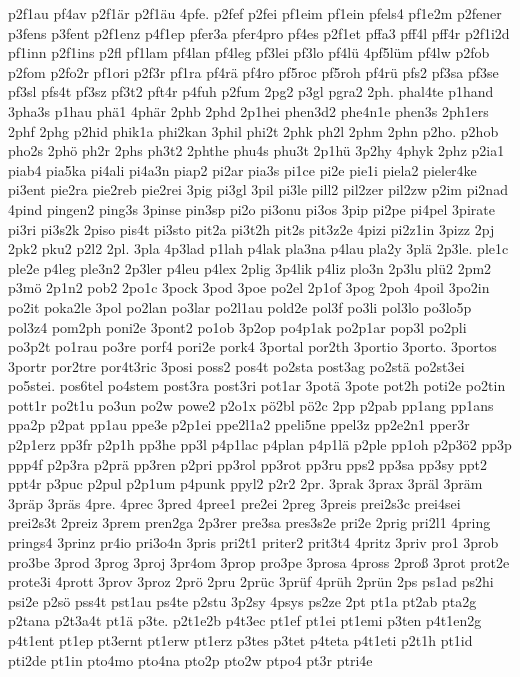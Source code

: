 {p2f1au
pf4av
p2f1är
p2f1äu
4pfe.
p2fef
p2fei
pf1eim
pf1ein
pfels4
pf1e2m
p2fener
p3fens
p3fent
p2f1enz
p4f1ep
pfer3a
pfer4pro
pf4es
p2f1et
pffa3
pff4l
pff4r
p2f1i2d
pf1inn
p2f1ins
p2fl
pf1lam
pf4lan
pf4leg
pf3lei
pf3lo
pf4lü
4pf5lüm
pf4lw
p2fob
p2fom
p2fo2r
pf1ori
p2f3r
pf1ra
pf4rä
pf4ro
pf5roc
pf5roh
pf4rü
pfs2
pf3sa
pf3se
pf3sl
pfs4t
pf3sz
pf3t2
pft4r
p4fuh
p2fum
2pg2
p3gl
pgra2
2ph.
phal4te
p1hand
3pha3s
p1hau
phä1
4phär
2phb
2phd
2p1hei
phen3d2
phe4n1e
phen3s
2ph1ers
2phf
2phg
p2hid
phik1a
phi2kan
3phil
phi2t
2phk
ph2l
2phm
2phn
p2ho.
p2hob
pho2s
2phö
ph2r
2phs
ph3t2
2phthe
phu4s
phu3t
2p1hü
3p2hy
4phyk
2phz
p2ia1
piab4
pia5ka
pi4ali
pi4a3n
piap2
pi2ar
pia3s
pi1ce
pi2e
pie1i
piela2
pieler4ke
pi3ent
pie2ra
pie2reb
pie2rei
3pig
pi3gl
3pil
pi3le
pill2
pil2zer
pil2zw
p2im
pi2nad
4pind
pingen2
ping3s
3pinse
pin3sp
pi2o
pi3onu
pi3os
3pip
pi2pe
pi4pel
3pirate
pi3ri
pi3s2k
2piso
pis4t
pi3sto
pit2a
pi3t2h
pit2s
pit3z2e
4pizi
pi2z1in
3pizz
2pj
2pk2
pku2
p2l2
2pl.
3pla
4p3lad
p1lah
p4lak
pla3na
p4lau
pla2y
3plä
2p3le.
ple1c
ple2e
p4leg
ple3n2
2p3ler
p4leu
p4lex
2plig
3p4lik
p4liz
plo3n
2p3lu
plü2
2pm2
p3mö
2p1n2
pob2
2po1c
3pock
3pod
3poe
po2el
2p1of
3pog
2poh
4poil
3po2in
po2it
poka2le
3pol
po2lan
po3lar
po2l1au
pold2e
pol3f
po3li
pol3lo
po3lo5p
pol3z4
pom2ph
poni2e
3pont2
po1ob
3p2op
po4p1ak
po2p1ar
pop3l
po2pli
po3p2t
po1rau
po3re
porf4
pori2e
pork4
3portal
por2th
3portio
3porto.
3portos
3portr
por2tre
por4t3ric
3posi
poss2
pos4t
po2sta
post3ag
po2stä
po2st3ei
po5stei.
pos6tel
po4stem
post3ra
post3ri
pot1ar
3potä
3pote
pot2h
poti2e
po2tin
pott1r
po2t1u
po3un
po2w
powe2
p2o1x
pö2bl
pö2c
2pp
p2pab
pp1ang
pp1ans
ppa2p
p2pat
pp1au
ppe3e
p2p1ei
ppe2l1a2
ppeli5ne
ppel3z
pp2e2n1
pper3r
p2p1erz
pp3fr
p2p1h
pp3he
pp3l
p4p1lac
p4plan
p4p1lä
p2ple
pp1oh
p2p3ö2
pp3p
ppp4f
p2p3ra
p2prä
pp3ren
p2pri
pp3rol
pp3rot
pp3ru
pps2
pp3sa
pp3sy
ppt2
ppt4r
p3puc
p2pul
p2p1um
p4punk
ppyl2
p2r2
2pr.
3prak
3prax
3präl
3präm
3präp
3präs
4pre.
4prec
3pred
4pree1
pre2ei
2preg
3preis
prei2s3c
prei4sei
prei2s3t
2preiz
3prem
pren2ga
2p3rer
pre3sa
pres3s2e
pri2e
2prig
pri2l1
4pring
prings4
3prinz
pr4io
pri3o4n
3pris
pri2t1
priter2
prit3t4
4pritz
3priv
pro1
3prob
pro3be
3prod
3prog
3proj
3pr4om
3prop
pro3pe
3prosa
4pross
2proß
3prot
prot2e
prote3i
4prott
3prov
3proz
2prö
2pru
2prüc
3prüf
4prüh
2prün
2ps
ps1ad
ps2hi
psi2e
p2sö
pss4t
pst1au
ps4te
p2stu
3p2sy
4psys
ps2ze
2pt
pt1a
pt2ab
pta2g
p2tana
p2t3a4t
pt1ä
p3te.
p2t1e2b
p4t3ec
pt1ef
pt1ei
pt1emi
p3ten
p4t1en2g
p4t1ent
pt1ep
pt3ernt
pt1erw
pt1erz
p3tes
p3tet
p4teta
p4t1eti
p2t1h
pt1id
pti2de
pt1in
pto4mo
pto4na
pto2p
pto2w
ptpo4
pt3r
ptri4e
}
